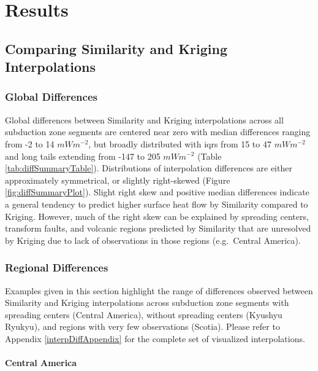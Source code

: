 \hypertarget{chpt3Results}{%
\section{Results}\label{chpt3Results}}

\hypertarget{interpDiff}{%
\subsection{Comparing Similarity and Kriging Interpolations}\label{interpDiff}}

\hypertarget{global-differences}{%
\subsubsection{Global Differences}\label{global-differences}}

Global differences between Similarity and Kriging interpolations across all subduction zone segments are centered near zero with median differences ranging from -2 to 14 \(mWm^{-2}\), but broadly distributed with \glspl{iqr} from 15 to 47 \(mWm^{-2}\) and long tails extending from -147 to 205 \(mWm^{-2}\) (Table \ref{tab:diffSummaryTable}). Distributions of interpolation differences are either approximately symmetrical, or slightly right-skewed (Figure \ref{fig:diffSummaryPlot}). Slight right skew and positive median differences indicate a general tendency to predict higher surface heat flow by Similarity compared to Kriging. However, much of the right skew can be explained by spreading centers, transform faults, and volcanic regions predicted by Similarity that are unresolved by Kriging due to lack of observations in those regions (e.g.~Central America).

\hypertarget{regional-differences}{%
\subsubsection{Regional Differences}\label{regional-differences}}

Examples given in this section highlight the range of differences observed between Similarity and Kriging interpolations across subduction zone segments with spreading centers (Central America), without spreading centers (Kyushyu Ryukyu), and regions with very few observations (Scotia). Please refer to Appendix \ref{interpDiffAppendix} for the complete set of visualized interpolations.

\hypertarget{central-america}{%
\paragraph{Central America}\label{central-america}}

